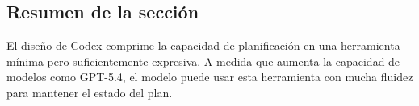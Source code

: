 \subsection{Resumen de la sección}

El diseño de Codex comprime la capacidad de planificación en una herramienta mínima pero suficientemente expresiva. A medida que aumenta la capacidad de modelos como GPT-5.4, el modelo puede usar esta herramienta con mucha fluidez para mantener el estado del plan.
